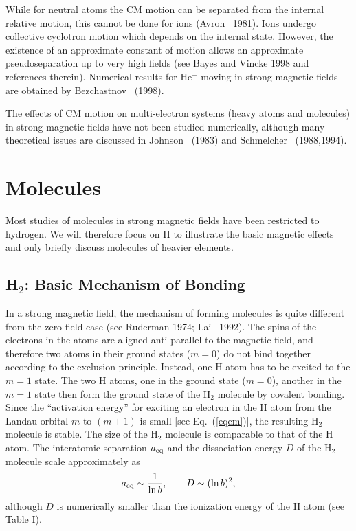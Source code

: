 While for neutral atoms the CM motion can be separated from the internal
relative motion, this cannot be done for ions (Avron \etal~1981).
Ions undergo collective cyclotron motion which depends on the internal state. 
However, the existence of an approximate constant of motion allows
an approximate pseudoseparation up to very high fields (see Bayes and Vincke
1998 and references therein). Numerical results for He$^+$ moving in strong
magnetic fields are obtained by Bezchastnov \etal~(1998). 

The effects of CM motion on multi-electron systems (heavy atoms and molecules)
in strong magnetic fields have not been studied numerically, although 
many theoretical issues are discussed in Johnson \etal~(1983) and 
Schmelcher \etal~(1988,1994).

\section{Molecules}

Most studies of molecules in strong magnetic fields have been 
restricted to hydrogen. We will therefore focus on H to 
illustrate the basic magnetic effects and only briefly discuss
molecules of heavier elements.

\subsection{H$_2$: Basic Mechanism of Bonding}

In a strong magnetic field, the mechanism of forming
molecules is quite different from the zero-field case
(see Ruderman 1974; Lai \etal~1992). The spins of the electrons in the atoms
are aligned anti-parallel to the magnetic field,
and therefore two atoms in their ground states ($m=0$) 
do not bind together according to the exclusion principle. 
Instead, one H atom has to be excited to the $m=1$ state. The
two H atoms, one in the ground state ($m=0$), another
in the $m=1$ state then form the ground state of the H$_2$ molecule by
covalent bonding. Since the ``activation energy'' for exciting
an electron in the H atom from the Landau orbital $m$ to $(m+1)$
is small [see Eq.~(\ref{eqem})], the resulting H$_2$ molecule is stable.
The size of the H$_2$ molecule is comparable to that of the H atom. 
The interatomic separation $a_{\rm eq}$ and the dissociation energy $D$ of the
H$_2$ molecule scale approximately as 
\begin{equation}
a_{\rm eq}\sim {1\over \ln b},\qquad D\sim (\ln b)^2,
\end{equation}
although $D$ is numerically smaller than the ionization energy of the H atom
(see Table I).

